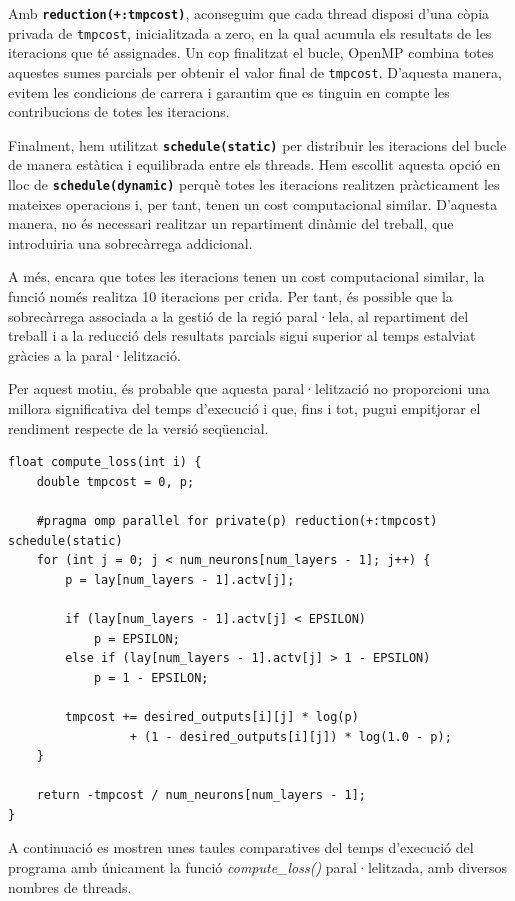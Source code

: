 \documentclass{article}
\begin{document}
Amb \textbf{\texttt{reduction(+:tmpcost)}}, aconseguim que cada thread disposi d'una còpia privada de \texttt{tmpcost}, inicialitzada a zero, en la qual acumula els resultats de les iteracions que té assignades. Un cop finalitzat el bucle, OpenMP combina totes aquestes sumes parcials per obtenir el valor final de \texttt{tmpcost}. D'aquesta manera, evitem les condicions de carrera i garantim que es tinguin en compte les contribucions de totes les iteracions.

Finalment, hem utilitzat \textbf{\texttt{schedule(static)}} per distribuir les iteracions del bucle de manera estàtica i equilibrada entre els threads. Hem escollit aquesta opció en lloc de
\textbf{\texttt{schedule(dynamic)}} perquè totes les iteracions realitzen pràcticament les mateixes operacions i, per tant, tenen un cost computacional similar. D'aquesta manera, no és necessari realitzar un repartiment dinàmic del treball, que introduiria una sobrecàrrega addicional.

A més, encara que totes les iteracions tenen un cost computacional similar, la funció només realitza 10 iteracions per crida. Per tant, és possible que la sobrecàrrega associada a la gestió de la regió paral·lela, al repartiment del treball i a la reducció dels resultats parcials sigui superior al temps estalviat gràcies a la paral·lelització.

Per aquest motiu, és probable que aquesta paral·lelització no proporcioni una millora significativa del temps d'execució i que, fins i tot, pugui empitjorar el rendiment respecte de la versió seqüencial.

\begin{lstlisting}
float compute_loss(int i) {
    double tmpcost = 0, p;

    #pragma omp parallel for private(p) reduction(+:tmpcost) schedule(static)
    for (int j = 0; j < num_neurons[num_layers - 1]; j++) {
        p = lay[num_layers - 1].actv[j];

        if (lay[num_layers - 1].actv[j] < EPSILON)
            p = EPSILON;
        else if (lay[num_layers - 1].actv[j] > 1 - EPSILON)
            p = 1 - EPSILON;

        tmpcost += desired_outputs[i][j] * log(p)
                 + (1 - desired_outputs[i][j]) * log(1.0 - p);
    }

    return -tmpcost / num_neurons[num_layers - 1];
}
\end{lstlisting}

A continuació es mostren unes taules comparatives del temps d'execució del programa amb únicament la funció \textit{compute\_loss()} paral·lelitzada, amb diversos nombres de threads.
\end{document}
